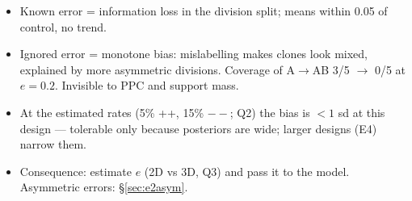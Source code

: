 \documentclass[10pt,a4paper]{article}
\begin{document}
\begin{itemize}
\item Known error = information loss in the division split; means within 0.05 of control, no trend.
\item Ignored error = monotone bias: mislabelling makes clones look mixed, explained by more asymmetric divisions. Coverage of A$\to$AB 3/5 $\to$ 0/5 at $e=0.2$. Invisible to PPC and support mass.
\item At the estimated rates (5\% ++, 15\% $--$; Q2) the bias is $<1$ sd at this design --- tolerable only because posteriors are wide; larger designs (E4) narrow them.
\item Consequence: estimate $e$ (2D vs 3D, Q3) and pass it to the model. Asymmetric errors: \S\ref{sec:e2asym}.
\end{itemize}

\end{document}
